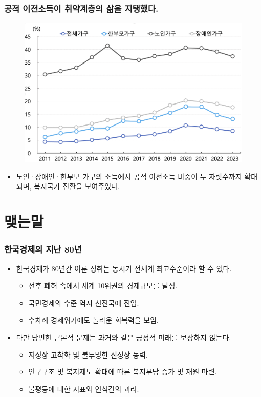 \documentclass[aspectratio=169,xcolor=dvipsnames,handout]{beamer}
\begin{document}
\begin{frame}[<+->]
\frametitle{공적 이전소득이 취약계층의 삶을 지탱했다.}
    \begin{figure}
        \centering
        \includegraphics[width=.5\textwidth]{pic/fig_ineq_11.png}
    \end{figure}
    \begin{itemize}
        \item 노인·장애인·한부모 가구의 소득에서 공적 이전소득 비중이 두 자릿수까지 확대되며, 복지국가 전환을 보여주었다.
    \end{itemize}
\end{frame}


\section{맺는말}%
\begin{frame}[<+->]
\frametitle{한국경제의 지난 80년}
    \begin{itemize}
        \item 한국경제가 80년간 이룬 성취는 동시기 전세계 최고수준이라 할 수 있다.
            \begin{itemize}[<+->]
                \item 전후 폐허 속에서 세계 10위권의 경제규모를 달성.
                \item 국민경제의 수준 역시 선진국에 진입.
                \item 수차례 경제위기에도 놀라운 회복력을 보임.
            \end{itemize}
        \item 다만 당면한 근본적 문제는 과거와 같은 긍정적 미래를 보장하지 않는다.
            \begin{itemize}[<+->]
                \item 저성장 고착화 및 불투명한 신성장 동력.
                \item 인구구조 및 복지제도 확대에 따른 복지부담 증가 및 재원 마련.
                \item 불평등에 대한 지표와 인식간의 괴리.
            \end{itemize}
    \end{itemize}
\end{frame}
\end{document}

